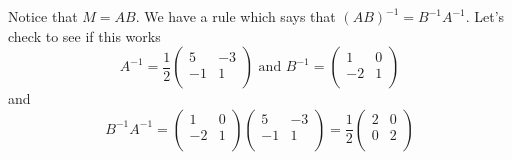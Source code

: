{Notice that $M = AB$. We have a rule which says that  $(AB)^{-1} = B^{-1}A^{-1}$. Let's check to see if this works
\[
A^{-1} =
\frac{1}{2}
\left( \begin{array}{cc}
5 & -3  \\
-1 & 1\\
\end{array} \right)
\text{ and }
B^{-1}=
\left( \begin{array}{cc}
1 & 0  \\
-2 & 1 \\
\end{array} \right)
\]
and 
\[
B^{-1}A^{-1}=
\left( \begin{array}{cc}
1 & 0  \\
-2 & 1 \\
\end{array} \right)
\left( \begin{array}{cc}
5 & -3  \\
-1 & 1\\
\end{array} \right)
= \frac{1}{2}
\left( \begin{array}{cc}
2 & 0  \\
0 & 2\\
\end{array} \right)
\]



} %

